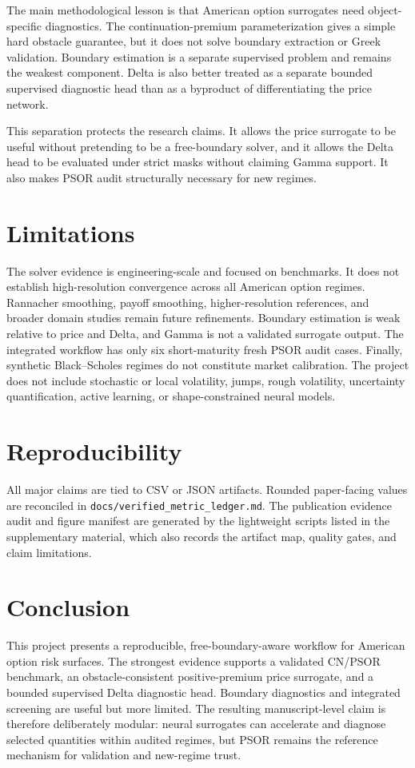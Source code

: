 \documentclass[11pt]{article}
\begin{document}
The main methodological lesson is that American option surrogates need object-specific diagnostics. The continuation-premium parameterization gives a simple hard obstacle guarantee, but it does not solve boundary extraction or Greek validation. Boundary estimation is a separate supervised problem and remains the weakest component. Delta is also better treated as a separate bounded supervised diagnostic head than as a byproduct of differentiating the price network.

This separation protects the research claims. It allows the price surrogate to be useful without pretending to be a free-boundary solver, and it allows the Delta head to be evaluated under strict masks without claiming Gamma support. It also makes PSOR audit structurally necessary for new regimes.

\section{Limitations}

The solver evidence is engineering-scale and focused on benchmarks. It does not
establish high-resolution convergence across all American option regimes.
Rannacher smoothing, payoff smoothing, higher-resolution references, and
broader domain studies remain future refinements. Boundary estimation is weak
relative to price and Delta, and Gamma is not a validated surrogate output.
The integrated workflow has only six short-maturity fresh PSOR audit cases.
Finally, synthetic Black--Scholes regimes do not constitute market calibration.
The project does not include stochastic or local volatility, jumps, rough
volatility, uncertainty quantification, active learning, or shape-constrained
neural models.

\section{Reproducibility}

All major claims are tied to CSV or JSON artifacts. Rounded paper-facing values
are reconciled in \texttt{docs/verified\_metric\_ledger.md}. The publication
evidence audit and figure manifest are generated by the lightweight scripts
listed in the supplementary material, which also records the artifact map,
quality gates, and claim limitations.

\section{Conclusion}

This project presents a reproducible, free-boundary-aware workflow for American option risk surfaces. The strongest evidence supports a validated CN/PSOR benchmark, an obstacle-consistent positive-premium price surrogate, and a bounded supervised Delta diagnostic head. Boundary diagnostics and integrated screening are useful but more limited. The resulting manuscript-level claim is therefore deliberately modular: neural surrogates can accelerate and diagnose selected quantities within audited regimes, but PSOR remains the reference mechanism for validation and new-regime trust.



\end{document}
